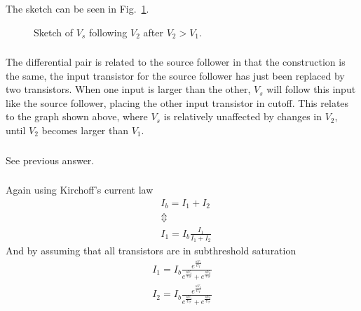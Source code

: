 \subsubsection{}
The sketch can be seen in Fig.~\ref{fig:1d}.
\begin{figure}
    \center
    \caption{Sketch of $V_s$ following $V_2$ after $V_2>V_1$.}
    \label{fig:1d}
\end{figure}
\subsubsection{}
The differential pair is related to the source follower in that the construction is the same, the input transistor for the 
source follower has just been replaced by two transistors. When one input is larger than the other, \(V_s\) will follow this
input like the source follower, placing the other input transistor in cutoff. This relates to the graph shown above, where
\(V_s\) is relatively unaffected by changes in \(V_2\), until \(V_2\) becomes larger than \(V_1\).
\subsubsection{}
See previous answer.
\subsubsection{}
Again using Kirchoff's current law
\begin{align*}
    &I_b = I_1+I_2 \\
    &\Updownarrow \\
    &I_1 = I_b \frac{I_1}{I_1+I_2}
\end{align*}
And by assuming that all transistors are in subthreshold saturation
\begin{align*}
    I_1 = I_b \frac{e^{\frac{\kappa V_1}{U_T}}}{e^{\frac{\kappa V_1}{U_T}}+e^{\frac{\kappa V_2}{U_T}}} \\
    I_2 = I_b \frac{e^{\frac{\kappa V_2}{U_T}}}{e^{\frac{\kappa V_1}{U_T}}+e^{\frac{\kappa V_2}{U_T}}} \\
\end{align*}
